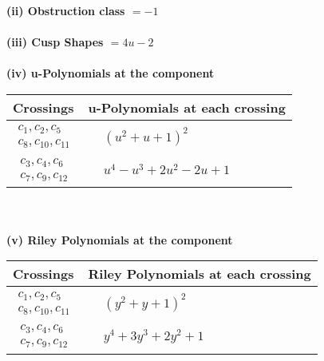 \documentclass[1p]{elsarticle_modified}
\theoremstyle{definition}
\begin{document}
\flushleft \textbf{(ii) Obstruction class $= -1$}\\~\\
\flushleft \textbf{(iii) Cusp Shapes $= 4 u-2$}\\~\\
\newpage\renewcommand{\arraystretch}{1}
\flushleft \textbf{(iv) u-Polynomials at the component}\newline \\
\begin{tabular}{m{50pt}|m{274pt}}
Crossings & \hspace{64pt}u-Polynomials at each crossing \\
\hline $$\begin{aligned}c_{1},c_{2},c_{5}\\c_{8},c_{10},c_{11}\end{aligned}$$&$\begin{aligned}
&(u^2+u+1)^2
\end{aligned}$\\
\hline $$\begin{aligned}c_{3},c_{4},c_{6}\\c_{7},c_{9},c_{12}\end{aligned}$$&$\begin{aligned}
&u^4- u^3+2 u^2-2 u+1
\end{aligned}$\\
\hline
\end{tabular}\\~\\
\newpage\renewcommand{\arraystretch}{1}
\flushleft \textbf{(v) Riley Polynomials at the component}\newline \\
\begin{tabular}{m{50pt}|m{274pt}}
Crossings & \hspace{64pt}Riley Polynomials at each crossing \\
\hline $$\begin{aligned}c_{1},c_{2},c_{5}\\c_{8},c_{10},c_{11}\end{aligned}$$&$\begin{aligned}
&(y^2+y+1)^2
\end{aligned}$\\
\hline $$\begin{aligned}c_{3},c_{4},c_{6}\\c_{7},c_{9},c_{12}\end{aligned}$$&$\begin{aligned}
&y^4+3 y^3+2 y^2+1
\end{aligned}$\\
\hline
\end{tabular}\\~\\
\end{document}
